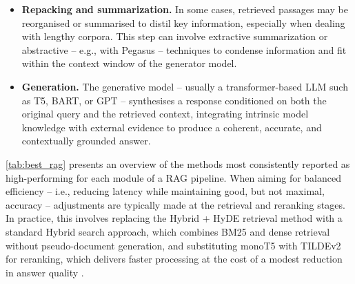 \begin{spacing}{1.5}
\begin{itemize}
    \item \textbf{Repacking and summarization.} In some cases, retrieved passages may be reorganised or summarised to distil key information, especially when dealing with lengthy corpora. This step can involve extractive summarization or abstractive -- e.g., with Pegasus -- techniques to condense information and fit within the context window of the generator model.
    \item \textbf{Generation.} The generative model -- usually a transformer-based LLM such as T5, BART, or GPT -- synthesises a response conditioned on both the original query and the retrieved context, integrating intrinsic model knowledge with external evidence to produce a coherent, accurate, and contextually grounded answer.
\end{itemize}


\autoref{tab:best_rag} presents an overview of the methods most consistently reported as high-performing for each module of a RAG pipeline. When aiming for balanced efficiency -- i.e., reducing latency while maintaining good, but not maximal, accuracy -- adjustments are typically made at the retrieval and reranking stages. In practice, this involves replacing the Hybrid + HyDE retrieval method with a standard Hybrid search approach, which combines BM25 and dense retrieval without pseudo-document generation, and substituting monoT5 with TILDEv2 for reranking, which delivers faster processing at the cost of a modest reduction in answer quality \citep{wang_searching_2024}.


\end{spacing}
